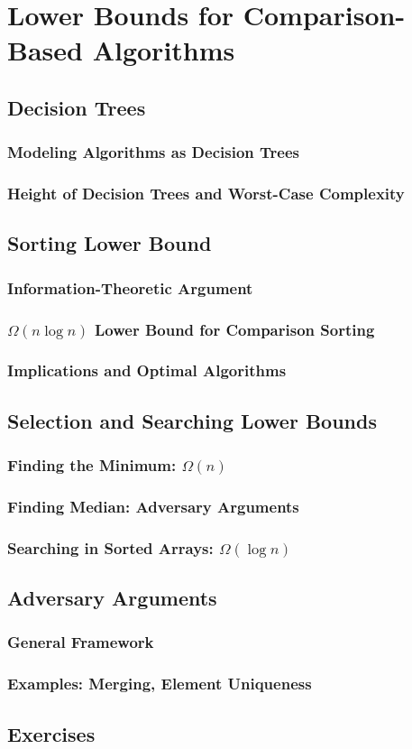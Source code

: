 
\chapter{Lower Bounds for Comparison-Based Algorithms}
\section{Decision Trees}
\subsection{Modeling Algorithms as Decision Trees}
\subsection{Height of Decision Trees and Worst-Case Complexity}

\section{Sorting Lower Bound}
\subsection{Information-Theoretic Argument}
\subsection{$\Omega(n \log n)$ Lower Bound for Comparison Sorting}
\subsection{Implications and Optimal Algorithms}

\section{Selection and Searching Lower Bounds}
\subsection{Finding the Minimum: $\Omega(n)$}
\subsection{Finding Median: Adversary Arguments}
\subsection{Searching in Sorted Arrays: $\Omega(\log n)$}

\section{Adversary Arguments}
\subsection{General Framework}
\subsection{Examples: Merging, Element Uniqueness}

\section{Exercises}
